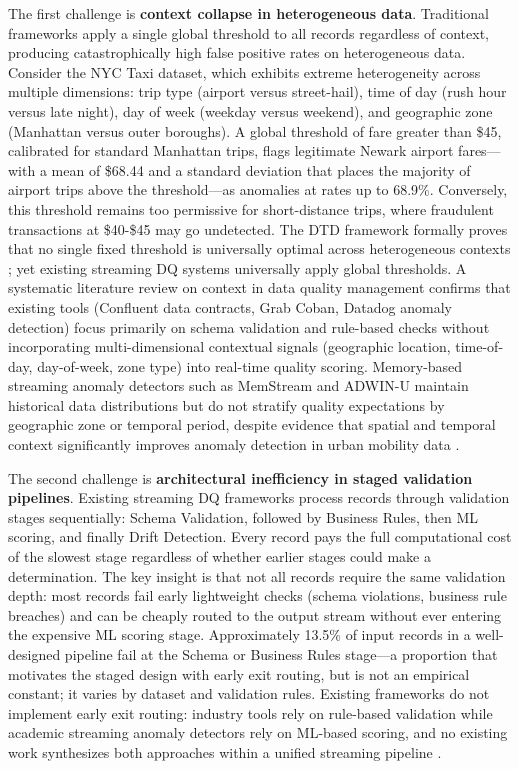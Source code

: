 The first challenge is \textbf{context collapse in heterogeneous data}. Traditional frameworks apply a single global threshold to all records regardless of context, producing catastrophically high false positive rates on heterogeneous data. Consider the NYC Taxi dataset, which exhibits extreme heterogeneity across multiple dimensions: trip type (airport versus street-hail), time of day (rush hour versus late night), day of week (weekday versus weekend), and geographic zone (Manhattan versus outer boroughs). A global threshold of fare greater than \$45, calibrated for standard Manhattan trips, flags legitimate Newark airport fares---with a mean of \$68.44 and a standard deviation that places the majority of airport trips above the threshold---as anomalies at rates up to 68.9\%. Conversely, this threshold remains too permissive for short-distance trips, where fraudulent transactions at \$40-\$45 may go undetected. The DTD framework formally proves that no single fixed threshold is universally optimal across heterogeneous contexts \cite{dtd2026}; yet existing streaming DQ systems universally apply global thresholds. A systematic literature review on context in data quality management \cite{contextdq2022} confirms that existing tools (Confluent data contracts, Grab Coban, Datadog anomaly detection) focus primarily on schema validation and rule-based checks without incorporating multi-dimensional contextual signals (geographic location, time-of-day, day-of-week, zone type) into real-time quality scoring. Memory-based streaming anomaly detectors such as MemStream \cite{bhatia2022memstream} and ADWIN-U \cite{adwin2025} maintain historical data distributions but do not stratify quality expectations by geographic zone or temporal period, despite evidence that spatial and temporal context significantly improves anomaly detection in urban mobility data \cite{bestad2025}.

The second challenge is \textbf{architectural inefficiency in staged validation pipelines}. Existing streaming DQ frameworks process records through validation stages sequentially: Schema Validation, followed by Business Rules, then ML scoring, and finally Drift Detection. Every record pays the full computational cost of the slowest stage regardless of whether earlier stages could make a determination. The key insight is that not all records require the same validation depth: most records fail early lightweight checks (schema violations, business rule breaches) and can be cheaply routed to the output stream without ever entering the expensive ML scoring stage. Approximately 13.5\% of input records in a well-designed pipeline fail at the Schema or Business Rules stage---a proportion that motivates the staged design with early exit routing, but is not an empirical constant; it varies by dataset and validation rules. Existing frameworks do not implement early exit routing: industry tools rely on rule-based validation while academic streaming anomaly detectors rely on ML-based scoring, and no existing work synthesizes both approaches within a unified streaming pipeline \cite{contextdq2022}.


